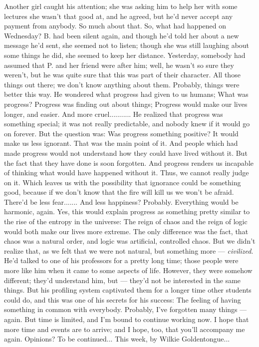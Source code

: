 Another girl caught his attention; she was asking him to help her with some lectures she wasn't that good at, and he agreed, but he'd never accept any payment from anybody. 
So much about that. 
So, what had happened on Wednesday? B. had been silent again, and though he'd told her about a new message he'd sent, she seemed not to listen; though she was still laughing about some things he did, she seemed to keep her distance. Yesterday, somebody had assumed that P. and her friend were after him; well, he wasn't so sure they weren't, but he was quite sure that this was part of their character. All those things out there; we don't know anything about them. 
Probably, things were better this way. He wondered what progress had given to us humans; What was progress?
Progress was finding out about things; Progress would make our lives longer, and easier. And more cruel...........
He realized that progress was something special; it was not really predictable, and nobody knew if it would go on forever. But the question was: Was progress something positive?
It would make us less ignorant. That was the main point of it. And people which had made progress would not understand how they could have lived without it. But the fact that they have done is soon forgotten. And progress renders us incapable of thinking what would have happened without it. Thus, we cannot really judge on it. 
Which leaves us with the possibility that ignorance could be something good, because if we don't know that the fire will kill us we won't be afraid. There'd be less fear.......
And less happiness? Probably. Everything would be harmonic, again. Yes, this would explain progress as something pretty similar to the rise of the entropy in the universe: The reign of chaos and the reign of logic would both make our lives more extreme. 
The only difference was the fact, that chaos was a natural order, and logic was artificial, controlled chaos. 
But we didn't realize that, as we felt that we were not natural, but something more --- \emph{civilized}. 
He'd talked to one of his professors for a pretty long time; those people were more like him when it came to some aspects of life. However, they were somehow different; they'd understand him, but --- they'd not be interested in the same things. But his profiling system captivated them for a longer time other students could do, and this was one of his secrets for his success: The feeling of having something in common with everybody. 
Probably, I've forgotten many things --- again. But time is limited, and I'm bound to continue working now. 
I hope that more time and events are to arrive; and I hope, too, that you'll accompany me again. 
Opinions?
To be continued...
This week, by Wilkie Goldentongue...

